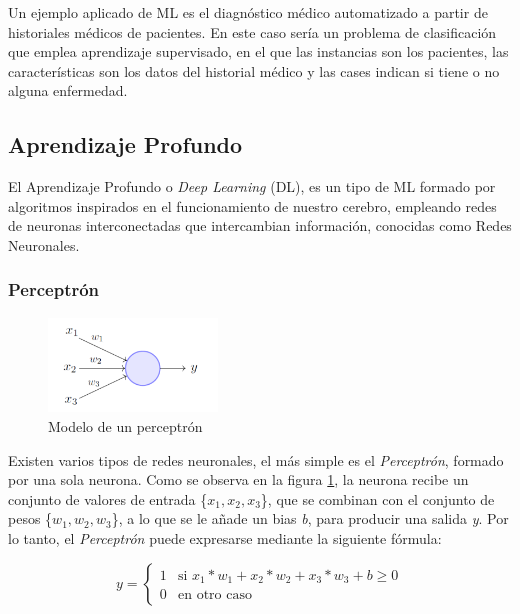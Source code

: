 Un ejemplo aplicado de ML es el diagnóstico médico automatizado a partir de historiales médicos de pacientes. 
En este caso sería un problema de clasificación que emplea aprendizaje supervisado, en el que las instancias son los pacientes,
las características son los datos del historial médico y las cases indican si tiene o no alguna enfermedad. 

\subsection{Aprendizaje Profundo}
El Aprendizaje Profundo o \textit{Deep Learning} (DL), es un tipo de ML formado por algoritmos inspirados en el funcionamiento de nuestro cerebro,
empleando redes de neuronas interconectadas que intercambian información, conocidas como Redes Neuronales.

\subsubsection{Perceptrón}
\begin{figure}[H]
    \centering
    \includegraphics[width=0.40\textwidth]{Imagenes/GeoAI/perceptron.png}
    \caption{Modelo de un perceptrón} \label{fig:perceptron}
\end{figure}

Existen varios tipos de redes neuronales, el más simple es el \textit{Perceptrón}, formado por una sola neurona.
Como se observa en la figura \ref{fig:perceptron}, la neurona recibe un conjunto de valores de entrada \{$x_1, x_2, x_3$\}, 
que se combinan con el conjunto de pesos \{$w_1, w_2, w_3$\}, a lo que se le añade un bias \textit{b}, para producir una salida \textit{y}.
Por lo tanto, el \textit{Perceptrón} puede expresarse mediante la siguiente fórmula:
    
\[
    y =
    \begin{cases}
        1 & \text{si $x_1*w_1+x_2*w_2+x_3*w_3+b \geq 0$}\\
        0 & \text{en otro caso}
    \end{cases}
\]

